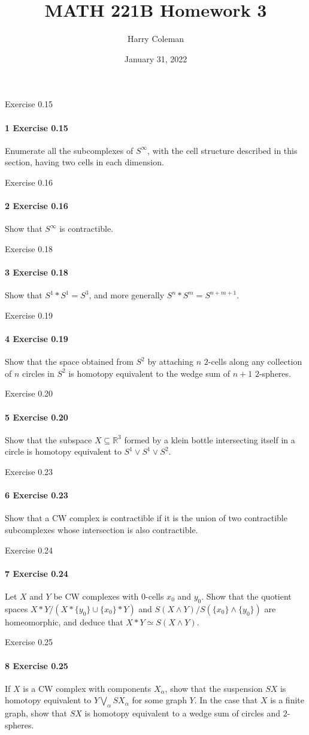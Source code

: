 \documentclass[12pt]{article}
\renewcommand{\maketitle}{\thispagestyle{title}}
\newlength{\myparskip}
\newenvironment{fullbox}{\begin{lrbox}{\savefullbox}\begin{minipage}{\dimexpr\textwidth-2\fboxsep\relax}\setlength{\parskip}{\myparskip}}{\end{minipage}\end{lrbox}\framebox[\textwidth]{\usebox{\savefullbox}}}
\newenvironment{pbox}[1][]{\begin{fullbox}\ifx#1\empty\else\paragraph{#1}\phantom{}\fi}{\end{fullbox}}
\theoremstyle{definition}
\newcommand{\R}{\mathbb{R}}
\newcommand{\<}{\langle}
\renewcommand{\>}{\rangle}
\newcommand{\seq}{\subseteq}
\newcommand{\htpy}{\simeq}
\begin{document}
\title{MATH 221B Homework 3}
\author{Harry Coleman}
\date{January 31, 2022}
\maketitle


\begin{pbox}[1 Exercise 0.15]
    Enumerate all the subcomplexes of $S^\infty$, with the cell structure described in this section, having two cells in each dimension.
\end{pbox}

\begin{pbox}[2 Exercise 0.16]
    Show that $S^\infty$ is contractible.
\end{pbox}

\begin{pbox}[3 Exercise 0.18]
    Show that $S^1 * S^1 = S^3$, and more generally $S^n * S^m = S^{n+m+1}$.
\end{pbox}

\begin{pbox}[4 Exercise 0.19]
    Show that the space obtained from $S^2$ by attaching $n$ $2$-cells along any collection of $n$ circles in $S^2$ is homotopy equivalent to the wedge sum of $n + 1$ $2$-spheres.
\end{pbox}

\begin{pbox}[5 Exercise 0.20]
    Show that the subspace $X \seq \R^3$ formed by a klein bottle intersecting itself in a circle is homotopy equivalent to $S^1 \vee S^1 \vee S^2$.
\end{pbox}

\begin{pbox}[6 Exercise 0.23]
    Show that a CW complex is contractible if it is the union of two contractible subcomplexes whose intersection is also contractible.
\end{pbox}

\begin{pbox}[7 Exercise 0.24]
    Let $X$ and $Y$ be CW complexes with $0$-cells $x_0$ and $y_0$.
    Show that the quotient spaces $X * Y / (X * \{y_0\} \cup \{x_0\} * Y)$ and $S(X \wedge Y) / S(\{x_0\} \wedge \{y_0\})$ are homeomorphic, and deduce that $X * Y \htpy S(X \wedge Y)$.
\end{pbox}

\begin{pbox}[8 Exercise 0.25]
    If $X$ is a CW complex with components $X_\alpha$, show that the suspension $SX$ is homotopy equivalent to $Y \bigvee_\alpha SX_\alpha$ for some graph $Y$.
    In the case that $X$ is a finite graph, show that $SX$ is homotopy equivalent to a wedge sum of circles and $2$-spheres.
\end{pbox}
\end{document}
